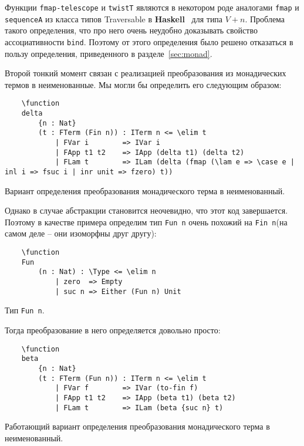 Функции \texttt{fmap-telescope} и \texttt{twistT} являются в некотором роде аналогами \texttt{fmap} и \texttt{sequenceA} из класса типов Traversable в \textbf{Haskell}~\cite{traversable} для типа $V + n$. Проблема такого определения, что про него очень неудобно доказывать свойство ассоциативности \texttt{bind}. Поэтому от этого определения было решено отказаться в пользу определения, приведенного в разделе~\ref{sec:monad}.

Второй тонкий момент связан с реализацией преобразования из монадических термов в неименованные. Мы могли бы определить его следующим образом:

\begin{listing}[H]
  \begin{verbatim}
    \function
    delta
        {n : Nat}
        (t : FTerm (Fin n)) : ITerm n <= \elim t
            | FVar i        => IVar i
            | FApp t1 t2    => IApp (delta t1) (delta t2)
            | FLam t        => ILam (delta (fmap (\lam e => \case e | inl i => fsuc i | inr unit => fzero) t))
  \end{verbatim}
  \caption{Вариант определения преобразования монадического терма в неименованный.}
\end{listing}

Однако в случае абстракции становится неочевидно, что этот код завершается. Поэтому в качестве примера определим тип \texttt{Fun n} очень похожий на \texttt{Fin n}(на самом деле -- они изоморфны друг другу):

\begin{listing}[H]
  \begin{verbatim}
    \function
    Fun
        (n : Nat) : \Type <= \elim n
            | zero  => Empty
            | suc n => Either (Fun n) Unit
  \end{verbatim}
  \caption{Тип \texttt{Fun n}.}
\end{listing}

Тогда преобразование в него определяется довольно просто:

\begin{listing}[H]
  \begin{verbatim}
    \function
    beta
        {n : Nat}
        (t : FTerm (Fun n)) : ITerm n <= \elim t
            | FVar f        => IVar (to-fin f)
            | FApp t1 t2    => IApp (beta t1) (beta t2)
            | FLam t        => ILam (beta {suc n} t)
  \end{verbatim}
  \caption{Работающий вариант определения преобразования монадического терма в неименованный.}
\end{listing}
